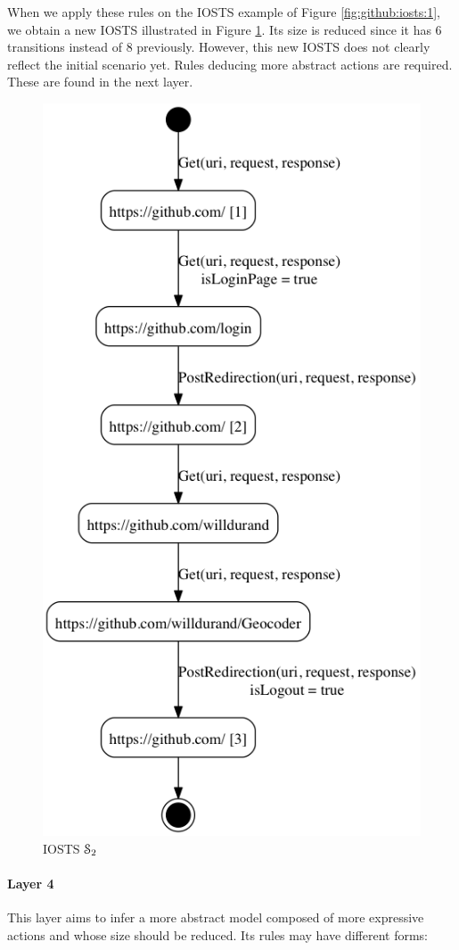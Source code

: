 \begin{example} When we apply these rules on the IOSTS example of
Figure \ref{fig:github:iosts:1}, we obtain a new IOSTS
illustrated in Figure \ref{fig:github:iosts:2}. Its size is
reduced since it has 6 transitions instead of 8 previously.
However, this new IOSTS does not clearly reflect the initial
scenario yet. Rules deducing more abstract actions are required.
These are found in the next layer.\end{example}

\begin{figure}[ht]
\begin{center}
\includegraphics[width=0.6\linewidth]{figures/gh-iosts-2.png}
\caption {IOSTS $\EuScript{S}_2$} \label{fig:github:iosts:2}
\end{center}
\end{figure}

\paragraph{Layer 4}

This layer aims to infer a more abstract model composed of more
expressive actions and whose size should be reduced. Its rules
may have different forms:

